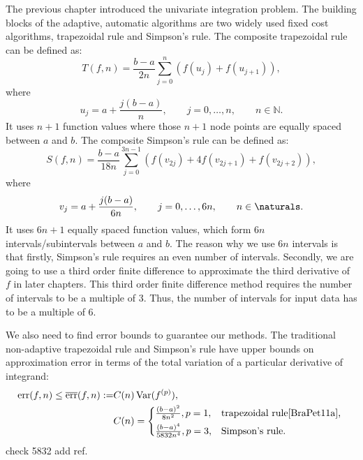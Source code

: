 \documentclass[draft]{iitthesis}
\DeclareMathOperator{\Var}{Var}
\theoremstyle{definition}
\theoremstyle{remark}
\begin{document}


The previous chapter introduced the univariate integration problem. The building blocks of the adaptive, automatic algorithms are two widely used fixed cost algorithms, trapezoidal rule and Simpson's rule.
The composite trapezoidal rule can be defined as:
\begin{equation}\label{traprule}
  T(f,n)=\frac{b-a}{2n}\sum_{j=0}^{n}(f(u_{j})+f(u_{j+1})),
\end{equation}
where
\begin{equation}\label{upts}
u_j=a+\frac{j(b-a)}{n}, \qquad j=0, \ldots, n, \qquad n\in\mathbb{N}.
\end{equation}
It uses $n+1$ function values where those $n+1$ node points are equally spaced between $a$ and $b$. The composite Simpson's rule can be defined as:
\begin{equation}\label{simrule}
  S(f,n)=\frac{b-a}{18n}\sum_{j=0}^{3n-1}(f(v_{2j})+4f(v_{2j+1})+f(v_{2j+2})),
\end{equation}
where
\begin{equation}\label{vpts}
v_j=a+\frac{j(b-a)}{6n}, \qquad j=0, \ldots, 6n, \qquad n\in \naturals.
\end{equation}
It uses $6n+1$ equally spaced function values, which form $6n$ intervals/subintervals between $a$ and $b$. The reason why we use $6n$ intervals is that firstly, Simpson's rule requires an even number of intervals. Secondly, we are going to use a third order finite difference to approximate the third derivative of $f$ in later chapters. This third order finite difference method requires the number of intervals to be a multiple of 3. Thus, the number of intervals for input data has to be a multiple of 6.

We also need to find error bounds to guarantee our methods. The traditional non-adaptive trapezoidal rule and Simpson's rule have upper bounds on approximation error in terms of the total variation of a particular derivative of integrand:
\begin{align}\label{errorbound}
    \text{err}(f,n)\le\overline{\text{err}}(f,n):=&C(n)\Var(f^{(p)}),\\
    \nonumber&C(n)=
    \begin{cases*}
           \frac{(b-a)^2}{8n^2}, p=1,  & \mbox{trapezoidal rule}\cite[(7.15)]{BraPet11a}, \\
           \frac{(b-a)^4}{5832n^4}, p=3, & \mbox{Simpson's rule}.
    \end{cases*}
\end{align}
check 5832 add ref.
\end{document}
